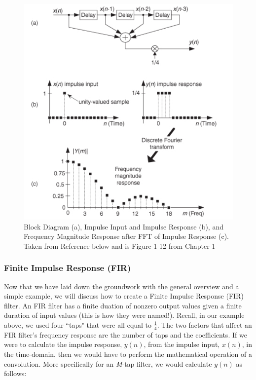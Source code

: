 \begin{figure}[h!]
	\centering
	\includegraphics[scale = .6]{impulse.png} %
	\caption{Block Diagram (a), Impulse Input and Impulse Response (b), and Frequency Magnitude Response after FFT of Impulse Response (c).  Taken from Reference \cite{lyons:intro} below and is Figure 1-12 from Chapter 1}
	\label{fig:impulse}
\end{figure}   

\subsubsection{Finite Impulse Response (FIR)}

Now that we have laid down the groundwork with the general overview and a simple example, we will discuss how to create a Finite Impulse Response (FIR) filter.  An FIR filter has a finite duation of nonzero output values given a finite duration of input values (this is how they were named!).  Recall, in our example above, we used four ``taps" that were all equal to $\frac{1}{4}$.  The two factors that affect an FIR filter's frequency response are the number of taps and the coefficients\cite{lyons:intro}.  If we were to calculate the impulse response, $y(n)$, from the impulse input, $x(n)$, in the time-domain, then we would have to perform the mathematical operation of a convolution.  More specifically for an \textit{M}-tap filter, we would calculate $y(n)$ as follows: 


